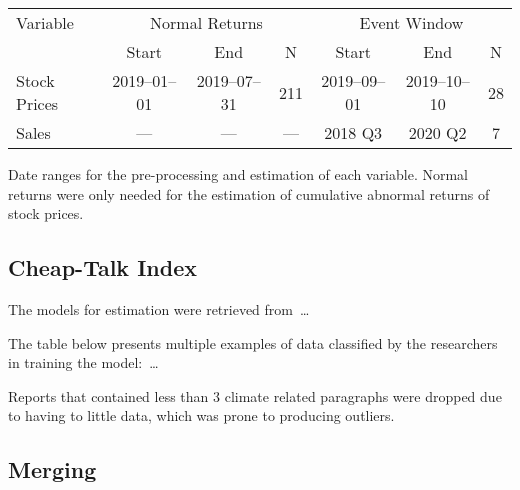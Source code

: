 \documentclass[12pt]{article}
\begin{document}



\begin{table}[ht]
    \label{tab:data_freq}
    \begin{tabular}{l| c c c| c c c}
        \toprule
        Variable     & \multicolumn{3}{c|}{Normal Returns} & \multicolumn{3}{c}{Event Window} \\
                     & Start & End          & N                 &   Start & End     &     N \\ 
        \midrule
        Stock Prices & 2019--01--01 & 2019--07--31 & 211 & 2019--09--01 & 2019--10--10 & 28\\
        Sales        & ---           &     ---     & --- & 2018 Q3 & 2020 Q2 & 7\\  
        \bottomrule
    \end{tabular}

    \vspace{0.2cm}

    \begin{tablenotes}
        \footnotesize
        \item Date ranges for the pre-processing and estimation of each variable. Normal returns were only needed for the estimation of cumulative abnormal returns of stock prices.
    \end{tablenotes}
\end{table}

\newpage
\normalsize
\raggedright{}

\subsection{Cheap-Talk Index}\label{app:data:cti}

The models for estimation were retrieved from\ \dots

The table below presents multiple examples of data classified by the researchers in training the model:\ \dots 

Reports that contained less than 3 climate related paragraphs were dropped due to having to little data, which was prone to producing outliers.

\subsection{Merging}\label{app:data:merging}
\end{document}
